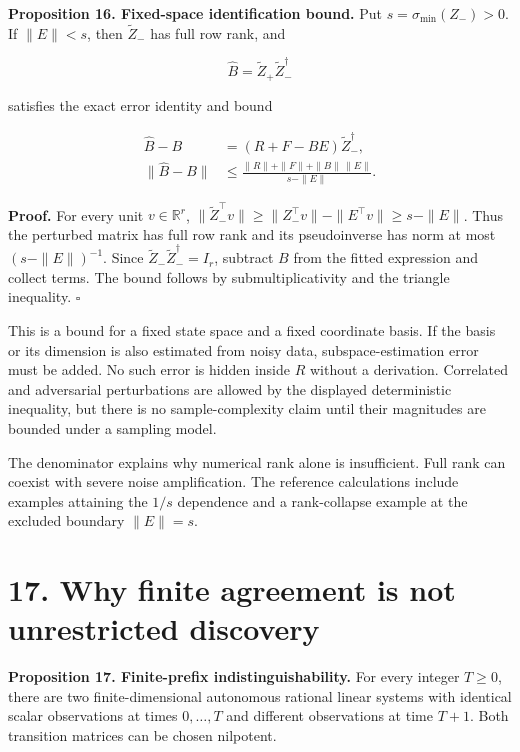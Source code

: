 \documentclass[11pt,letterpaper]{article}
\begin{document}
\textbf{Proposition 16. Fixed-space identification bound.} Put
\(s=\sigma_{\min}(Z_-)>0\). If \(\|E\|<s\), then \(\widetilde Z_-\) has
full row rank, and

\[
\widehat B=\widetilde Z_+\widetilde Z_-^\dagger
\]

satisfies the exact error identity and bound

\[
\begin{aligned}
\widehat B-B
&=(R+F-BE)\widetilde Z_-^\dagger,\\
\|\widehat B-B\|
&\leq\frac{\|R\|+\|F\|+\|B\|\,\|E\|}
{s-\|E\|}.
\end{aligned}
\]

\textbf{Proof.} For every unit \(v\in\mathbb R^r\),
\(\|\widetilde Z_-^\top v\|\geq\|Z_-^\top v\|-\|E^\top v\|\geq s-\|E\|\).
Thus the perturbed matrix has full row rank and its pseudoinverse has
norm at most \((s-\|E\|)^{-1}\). Since
\(\widetilde Z_-\widetilde Z_-^\dagger=I_r\), subtract \(B\) from the
fitted expression and collect terms. The bound follows by
submultiplicativity and the triangle inequality. \(\square\)

This is a bound for a fixed state space and a fixed coordinate basis. If
the basis or its dimension is also estimated from noisy data,
subspace-estimation error must be added. No such error is hidden inside
\(R\) without a derivation. Correlated and adversarial perturbations are
allowed by the displayed deterministic inequality, but there is no
sample-complexity claim until their magnitudes are bounded under a
sampling model.

The denominator explains why numerical rank alone is insufficient. Full
rank can coexist with severe noise amplification. The reference
calculations include examples attaining the \(1/s\) dependence and a
rank-collapse example at the excluded boundary \(\|E\|=s\).

\section{17. Why finite agreement is not unrestricted
discovery}\label{why-finite-agreement-is-not-unrestricted-discovery}

\textbf{Proposition 17. Finite-prefix indistinguishability.} For every
integer \(T\geq0\), there are two finite-dimensional autonomous rational
linear systems with identical scalar observations at times
\(0,\ldots,T\) and different observations at time \(T+1\). Both
transition matrices can be chosen nilpotent.
\end{document}
